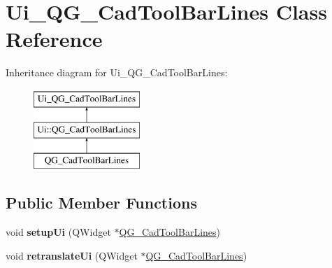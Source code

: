 \hypertarget{classUi__QG__CadToolBarLines}{\section{Ui\-\_\-\-Q\-G\-\_\-\-Cad\-Tool\-Bar\-Lines Class Reference}
\label{classUi__QG__CadToolBarLines}
}
Inheritance diagram for Ui\-\_\-\-Q\-G\-\_\-\-Cad\-Tool\-Bar\-Lines\-:\begin{figure}[H]
\begin{center}
\leavevmode
\includegraphics[height=3.000000cm]{classUi__QG__CadToolBarLines}
\end{center}
\end{figure}
\subsection*{Public Member Functions}
\begin{DoxyCompactItemize}
\item 
\hypertarget{classUi__QG__CadToolBarLines_a703fcd983c7f58a37def47d2fe9baa48}{void {\bfseries setup\-Ui} (Q\-Widget $\ast$\hyperlink{classQG__CadToolBarLines}{Q\-G\-\_\-\-Cad\-Tool\-Bar\-Lines})}\label{classUi__QG__CadToolBarLines_a703fcd983c7f58a37def47d2fe9baa48}

\item 
\hypertarget{classUi__QG__CadToolBarLines_aedca58a758524dd40c573bbb39d8dd68}{void {\bfseries retranslate\-Ui} (Q\-Widget $\ast$\hyperlink{classQG__CadToolBarLines}{Q\-G\-\_\-\-Cad\-Tool\-Bar\-Lines})}\label{classUi__QG__CadToolBarLines_aedca58a758524dd40c573bbb39d8dd68}

\end{DoxyCompactItemize}
